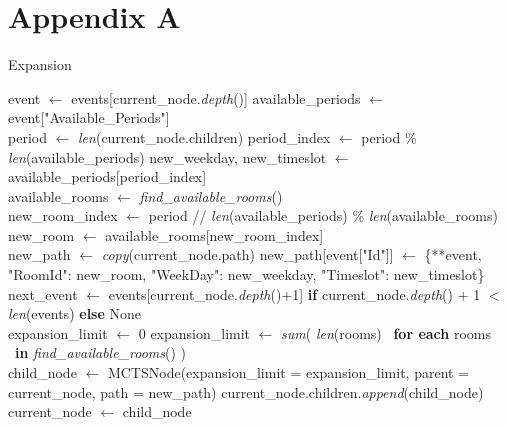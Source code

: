 
\chapter*{Appendix A} %

\label{AppendixA} %

\begin{algorithm}
\caption{Expansion}\label{expansion}
\begin{algorithmic}[1]
    \State event $\gets$ events[current\_node.\textit{depth}()]
    \State available\_periods $\gets$ event["Available\_Periods"]
    \\
    \State period $\gets$ \textit{len}(current\_node.children)
    \State period\_index $\gets$ period \% \textit{len}(available\_periods)
    \State new\_weekday, new\_timeslot $\gets$ available\_periods[period\_index]
    \\
    \State available\_rooms $\gets$ \textit{find\_available\_rooms}()
    \\
    \State new\_room\_index $\gets$ period // \textit{len}(available\_periods) \% \textit{len}(available\_rooms)
    \State new\_room $\gets$ available\_rooms[new\_room\_index]
    \\
    \State new\_path $\gets$ \textit{copy}(current\_node.path)
    \State new\_path[event["Id"]] $\gets$ \{**event, "RoomId": new\_room, "WeekDay": new\_weekday, "Timeslot": new\_timeslot\}
    \\
    \State next\_event $\gets$ events[current\_node.\textit{depth}()+1] \textbf{if} current\_node.\textit{depth}() + 1 $<$ \textit{len}(events) \textbf{else} None
    \\
         \State expansion\_limit $\gets$ 0
    \Else
         \State expansion\_limit $\gets$ \textit{sum}\big( \textit{len}(rooms) \ \textbf{for each} rooms \ \textbf{in} \textit{find\_available\_rooms}() \big)
    \EndIf
    \\
    \State child\_node $\gets$ MCTSNode(expansion\_limit = expansion\_limit, parent = current\_node, path = new\_path)
    \State current\_node.children.\textit{append}(child\_node)
    \State current\_node $\gets$ child\_node
\EndProcedure
\end{algorithmic}
\end{algorithm}

